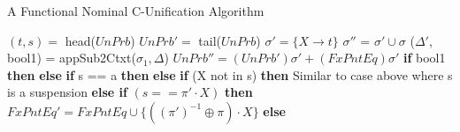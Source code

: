 \begin{frame}[allowframebreaks]{A Functional Nominal C-Unification Algorithm}
\begin{algorithmic}[1]
        \State {} 
    \Else 
    \State $(t, s) =$ head($UnPrb$)
    \State $UnPrb' =$ tail($UnPrb$)
            \State $\sigma' = \{X \rightarrow t \}$
            \State $\sigma''$ = $\sigma' \cup \sigma$ 
            \State ($\Delta'$, bool1) = appSub2Ctxt($\sigma_1, \Delta$) 
            \State $UnPrb'' = (UnPrb')\sigma' +   (FxPntEq)\sigma'$
            \Statex
            \State \textbf{if} bool1 \textbf{then}  
            \State \textbf{else} 
        \Else 
                \State \textbf{if} s == a \textbf{then} 
                \State \hspace{8 \algorithmicxindent} 
                \State \textbf{else} 
                \State \textbf{if} (X not in s) \textbf{then}
                \State \hspace{8 \algorithmicxindent}
                \Comment Similar to case above where s is a suspension
                \Statex \Statex \Statex
                \State \textbf{else if} $(s == \pi' \cdot X)$ \textbf{then}
                \State \hspace{8 \algorithmicxindent}
                $FxPntEq' = FxPntEq \cup \{((\pi')^{-1} \oplus \pi) \cdot X\}$
                \State \hspace{8 \algorithmicxindent}
                \State \textbf{else} 


\end{algorithmic}
\end{frame}
